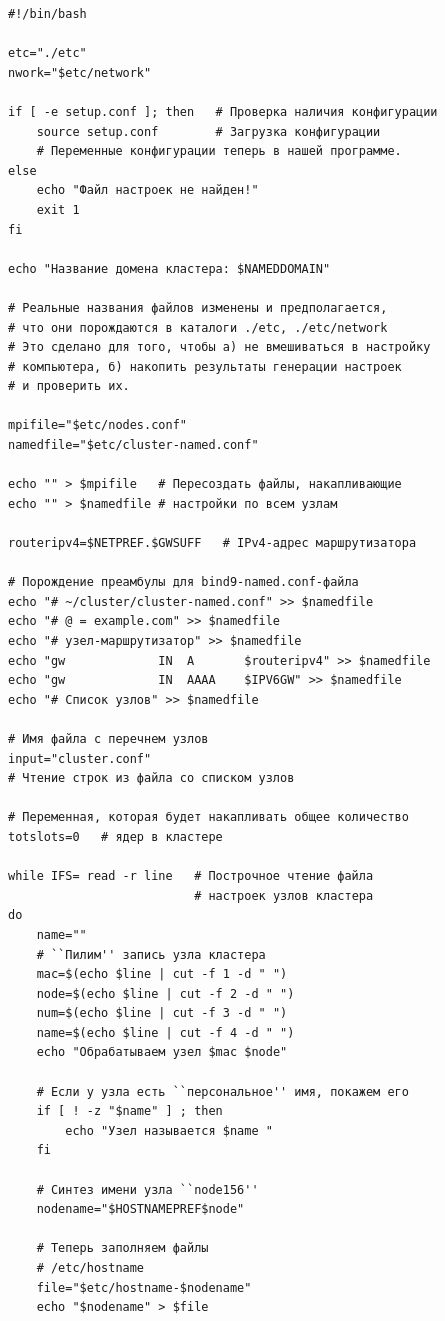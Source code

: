 \documentclass[12pt]{article}
\begin{document}
\begin{verbatim}
#!/bin/bash

etc="./etc"
nwork="$etc/network"

if [ -e setup.conf ]; then   # Проверка наличия конфигурации
    source setup.conf        # Загрузка конфигурации
    # Переменные конфигурации теперь в нашей программе.
else
    echo "Файл настроек не найден!"
    exit 1
fi

echo "Название домена кластера: $NAMEDDOMAIN"

# Реальные названия файлов изменены и предполагается,
# что они порождаются в каталоги ./etc, ./etc/network
# Это сделано для того, чтобы а) не вмешиваться в настройку
# компьютера, б) накопить результаты генерации настроек
# и проверить их.

mpifile="$etc/nodes.conf"
namedfile="$etc/cluster-named.conf"

echo "" > $mpifile   # Пересоздать файлы, накапливающие
echo "" > $namedfile # настройки по всем узлам

routeripv4=$NETPREF.$GWSUFF   # IPv4-адрес маршрутизатора

# Порождение преамбулы для bind9-named.conf-файла
echo "# ~/cluster/cluster-named.conf" >> $namedfile
echo "# @ = example.com" >> $namedfile
echo "# узел-маршрутизатор" >> $namedfile
echo "gw             IN  A       $routeripv4" >> $namedfile
echo "gw             IN  AAAA    $IPV6GW" >> $namedfile
echo "# Список узлов" >> $namedfile

# Имя файла с перечнем узлов
input="cluster.conf"
# Чтение строк из файла со списком узлов

# Переменная, которая будет накапливать общее количество
totslots=0   # ядер в кластере

while IFS= read -r line   # Построчное чтение файла
                          # настроек узлов кластера
do
    name=""
    # ``Пилим'' запись узла кластера
    mac=$(echo $line | cut -f 1 -d " ")
    node=$(echo $line | cut -f 2 -d " ")
    num=$(echo $line | cut -f 3 -d " ")
    name=$(echo $line | cut -f 4 -d " ")
    echo "Обрабатываем узел $mac $node"

    # Если у узла есть ``персональное'' имя, покажем его
    if [ ! -z "$name" ] ; then
        echo "Узел называется $name "
    fi

    # Синтез имени узла ``node156''
    nodename="$HOSTNAMEPREF$node"

    # Теперь заполняем файлы
    # /etc/hostname
    file="$etc/hostname-$nodename"
    echo "$nodename" > $file


\end{verbatim}
\end{document}
